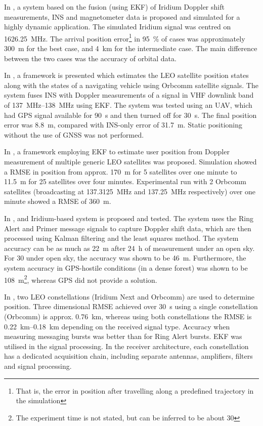 In \cite{sop05}, a system based on the fusion (using EKF) of Iridium Doppler shift measurements, INS and magnetometer data is proposed and simulated for a highly dynamic application. The simulated Iridium signal was centred on \qty{1626.25}{\mega\hertz}. The arrival position error\footnote{That is, the error in position after travelling along a predefined trajectory in the simulation} in \qty{95}{\percent} of cases was approximately \qty{300}{\metre} for the best case, and \qty{4}{\km} for the intermediate case. The main difference between the two cases was the accuracy of orbital data.

In \cite{sop08}, a framework is presented which estimates the LEO satellite position states along with the states of a navigating vehicle using Orbcomm satellite signals. The system fuses INS with Doppler measurements of a signal in VHF downlink band of \qtyrange{137}{138}{\mega\hertz} using EKF. The system was tested using an UAV, which had GPS signal available for \qty{90}{\s} and then turned off for \qty{30}{\s}. The final position error was \qty{8.8}{\m}, compared with INS-only error of \qty{31.7}{\m}. Static positioning without the use of GNSS was not performed.

In \cite{sop10}, a framework employing EKF to estimate user position from Doppler measurement of multiple generic LEO satellites was proposed. Simulation showed a RMSE in position from approx. \qty{170}{\m} for 5 satellites over one minute to \qty{11.5}{\m} for 25 satellites over four minutes. Experimental run with 2 Orbcomm satellites (broadcasting at \qty{137.3125}{\mega\hertz} and \qty{137.25}{\mega\hertz} respectively) over one minute showed a RMSE of \qty{360}{\m}.

In \cite{sop11}, and Iridium-based system is proposed and tested. The system uses the Ring Alert and Primer message signals to capture Doppler shift data, which are then processed using Kalman filtering and the least squares method. The system accuracy can be as much as \qty{22}{\m} after \qty{24}{\hour} of measurement under an open sky. For \qty{30}{\min} under open sky, the accuracy was shown to be \qty{46}{\m}. Furthermore, the system accuracy in GPS-hostile conditions (in a dense forest) was shown to be \qty{108}{\m}\footnote{The experiment time is not stated, but can be inferred to be about \qty{30}{\min}}, whereas GPS did not provide a solution.

In \cite{sop03}, two LEO constellations (Iridium Next and Orbcomm) are used to determine position. Three dimensional RMSE achieved over \qty{30}{\s} using a single constellation (Orbcomm) is approx. \qty{0.76}{\km}, whereas using both constellations the RMSE is \qtyrange{0.22}{0.18}{\km} depending on the received signal type. Accuracy when measuring messaging bursts was better than for Ring Alert bursts. EKF was utilised in the signal processing. In the receiver architecture, each constellation has a dedicated acquisition chain, including separate antennas, amplifiers, filters and signal processing. 

